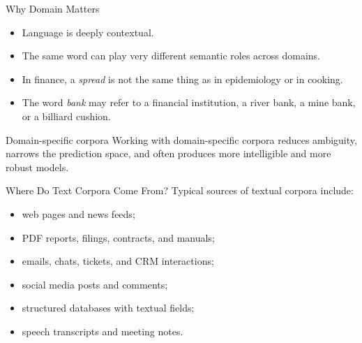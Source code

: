 \documentclass[aspectratio=169]{beamer}
\begin{document}
%
%
\begin{frame}{Why Domain Matters}
\begin{itemize}
    \item Language is deeply contextual.
    \item The same word can play very different semantic roles across domains.
    \item In finance, a \textit{spread} is not the same thing as in epidemiology or in cooking.
    \item The word \textit{bank} may refer to a financial institution, a river bank, a mine bank, or a billiard cushion.
\end{itemize}

\vspace{0.15cm}
\begin{alertblock}{Domain-specific corpora}
Working with domain-specific corpora reduces ambiguity, narrows the prediction space, and often produces more intelligible and more robust models.
\end{alertblock}
\end{frame}
%
%
\begin{frame}{Where Do Text Corpora Come From?}
Typical sources of textual corpora include:
\begin{itemize}
    \item web pages and news feeds;
    \item PDF reports, filings, contracts, and manuals;
    \item emails, chats, tickets, and CRM interactions;
    \item social media posts and comments;
    \item structured databases with textual fields;
    \item speech transcripts and meeting notes.
\end{itemize}

\vspace{0.15cm}
\end{frame}
%
%
\end{document}
